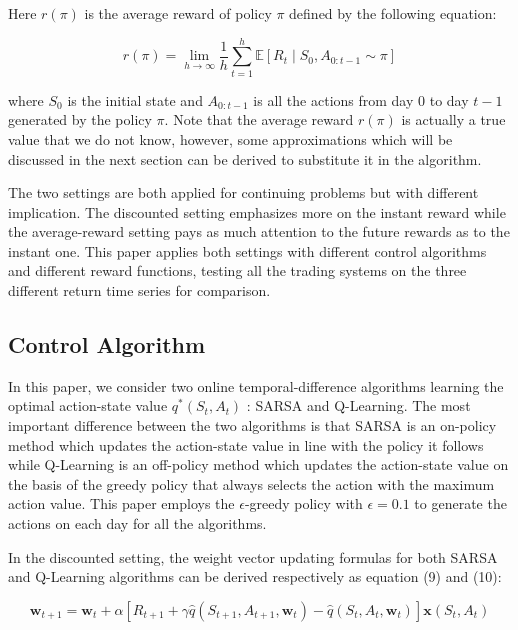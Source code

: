 \documentclass{article}
\begin{document}
\noindent Here $r\left ( \pi  \right )$ is the average reward of policy $\pi$ defined by the following equation:

\begin{equation}
	r\left ( \pi  \right ) = \lim_{h\rightarrow \infty }\frac{1}{h}\sum_{t=1}^{h}\mathbb{E}\left [ R_{t} \mid S_{0} ,A_{0:t-1}\sim \pi \right ]
\end{equation}

\noindent where $S_{0}$ is the initial state and $A_{0:t-1}$ is all the actions from day $0$ to day $t-1$ generated by the policy $\pi$. Note that the average reward $r\left ( \pi  \right )$ is actually a true value that we do not know, however, some approximations which will be discussed in the next section can be derived to substitute it in the algorithm. 

\indent The two settings are both applied for continuing problems but with different implication. The discounted setting emphasizes more on the instant reward while the average-reward setting pays as much attention to the future rewards as to the instant one. This paper applies both settings with different control algorithms and different reward functions, testing all the trading systems on the three different return time series for comparison.


\subsection{Control Algorithm} %


\noindent In this paper, we consider two online temporal-difference algorithms learning the optimal action-state value $q^{\ast }\left ( S_{t}, A_{t} \right )$ : SARSA and Q-Learning. The most important difference between the two algorithms is that SARSA is an on-policy method which updates the action-state value in line with the policy it follows while Q-Learning is an off-policy method which updates the action-state value on the basis of the greedy policy that always selects the action with the maximum action value. This paper employs the $\epsilon$-greedy policy with $\epsilon = 0.1$ to generate the actions on each day for all the algorithms.


\indent In the discounted setting, the weight vector updating formulas for both SARSA and Q-Learning algorithms can be derived respectively as equation (9) and (10):

\begin{equation}
	\mathbf{w}_{t+1} = \mathbf{w}_{t}+\alpha \left [ R_{t+1}+\gamma \hat{q}\left ( S_{t+1}, A_{t+1}, \mathbf{w}_{t} \right ) -\hat{q}\left ( S_{t}, A_{t}, \mathbf{w}_{t} \right ) \right ]\mathbf{x}\left ( S_{t}, A_{t} \right )
\end{equation}
\end{document}
